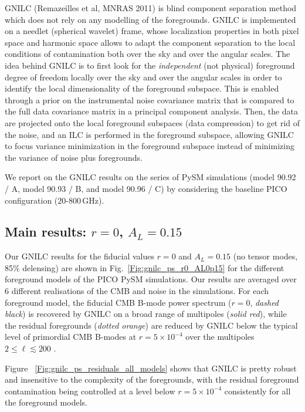 \documentclass[12pt]{article}
\begin{document}
GNILC (Remazeilles et al, MNRAS 2011) is blind component separation method which does not rely on any modelling of the foregrounds. GNILC is implemented on a needlet (spherical wavelet) frame, whose localization properties in both pixel space and harmonic space allows to adapt the component separation to the local conditions of contamination both over the sky and over the angular scales. The idea behind GNILC is to first look for the \emph{independent} (not physical) foreground degree of freedom locally over the sky and over the angular scales in order to identify the local dimensionality of the foreground subspace. This is enabled through a prior on the instrumental noise covariance matrix that is compared to the full data covariance matrix in a principal component analysis. Then, the data are projected onto the local foreground subspaces (data compression) to get rid of the noise, and an ILC is performed in the foreground subspace, allowing GNILC to focus variance minimization in the foreground subspace instead of minimizing the variance of noise plus foregrounds.

We report on the GNILC results on the series of PySM simulations (model 90.92 / A, model 90.93 / B, and model 90.96 / C) by considering the baseline PICO configuration  ({$20$-$800$\,GHz}). 

\subsection{Main results: $r=0$, $A_L=0.15$}

Our GNILC results for the fiducial values $r=0$ and $A_L=0.15$ (no tensor modes, 85\% delensing) are shown in Fig.~\ref{Fig:gnilc_ps_r0_AL0p15} for the different foreground models of the PICO PySM simulations. Our results are averaged over 6 different realisations of the CMB and noise in the simulations. For each foreground model, the fiducial CMB B-mode power spectrum ($r=0$, \emph{dashed black}) is recovered by GNILC on a broad range of multipoles (\emph{solid red}), while the residual foregrounds (\emph{dotted orange}) are  reduced by GNILC below the typical level of primordial CMB B-modes at $r=5\times 10^{-4}$ over the multipoles $2 \leq \ell \lesssim 200$  . 

Figure ~\ref{Fig:gnilc_ps_residuals_all_models} shows that GNILC is pretty robust and insensitive to the complexity of the foregrounds, with the residual foreground contamination being controlled at a level below $r=5\times 10^{-4}$ consistently for all the foreground models.
\end{document}
